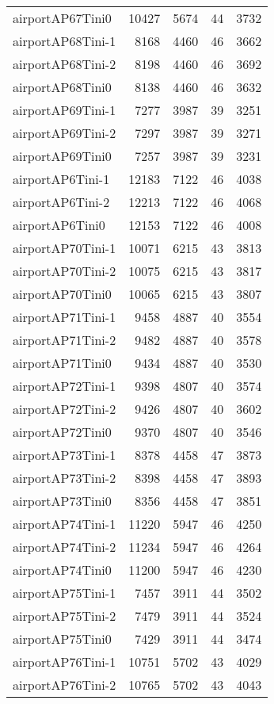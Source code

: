 \begin{longtable}{lrrrr}
airportAP67Tini0 & 10427 & 5674 & 44 & 3732 \\
airportAP68Tini-1 & 8168 & 4460 & 46 & 3662 \\
airportAP68Tini-2 & 8198 & 4460 & 46 & 3692 \\
airportAP68Tini0 & 8138 & 4460 & 46 & 3632 \\
airportAP69Tini-1 & 7277 & 3987 & 39 & 3251 \\
airportAP69Tini-2 & 7297 & 3987 & 39 & 3271 \\
airportAP69Tini0 & 7257 & 3987 & 39 & 3231 \\
airportAP6Tini-1 & 12183 & 7122 & 46 & 4038 \\
airportAP6Tini-2 & 12213 & 7122 & 46 & 4068 \\
airportAP6Tini0 & 12153 & 7122 & 46 & 4008 \\
airportAP70Tini-1 & 10071 & 6215 & 43 & 3813 \\
airportAP70Tini-2 & 10075 & 6215 & 43 & 3817 \\
airportAP70Tini0 & 10065 & 6215 & 43 & 3807 \\
airportAP71Tini-1 & 9458 & 4887 & 40 & 3554 \\
airportAP71Tini-2 & 9482 & 4887 & 40 & 3578 \\
airportAP71Tini0 & 9434 & 4887 & 40 & 3530 \\
airportAP72Tini-1 & 9398 & 4807 & 40 & 3574 \\
airportAP72Tini-2 & 9426 & 4807 & 40 & 3602 \\
airportAP72Tini0 & 9370 & 4807 & 40 & 3546 \\
airportAP73Tini-1 & 8378 & 4458 & 47 & 3873 \\
airportAP73Tini-2 & 8398 & 4458 & 47 & 3893 \\
airportAP73Tini0 & 8356 & 4458 & 47 & 3851 \\
airportAP74Tini-1 & 11220 & 5947 & 46 & 4250 \\
airportAP74Tini-2 & 11234 & 5947 & 46 & 4264 \\
airportAP74Tini0 & 11200 & 5947 & 46 & 4230 \\
airportAP75Tini-1 & 7457 & 3911 & 44 & 3502 \\
airportAP75Tini-2 & 7479 & 3911 & 44 & 3524 \\
airportAP75Tini0 & 7429 & 3911 & 44 & 3474 \\
airportAP76Tini-1 & 10751 & 5702 & 43 & 4029 \\
airportAP76Tini-2 & 10765 & 5702 & 43 & 4043 \\

\end{longtable}
